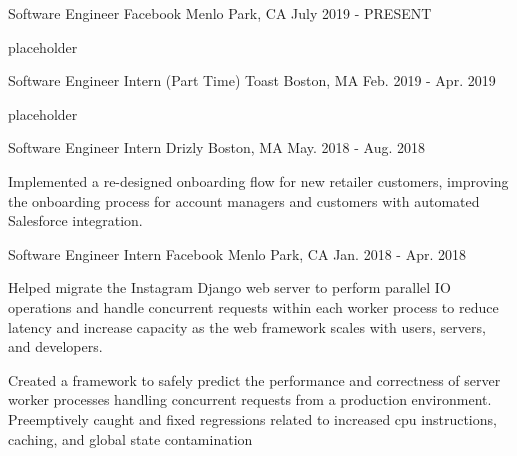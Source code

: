 
\begin{cventries}
  \cventry
    {Software Engineer} %
    {Facebook} %
    {Menlo Park, CA} %
    {July 2019 - PRESENT} %
    {
      \begin{cvitems} %
        \item {placeholder}
      \end{cvitems}
    }

  \cventry
    {Software Engineer Intern (Part Time)} %
    {Toast} %
    {Boston, MA} %
    {Feb. 2019 - Apr. 2019} %
    {
      \begin{cvitems} %
        \item {placeholder}
      \end{cvitems}
    }

  \cventry
    {Software Engineer Intern} %
    {Drizly} %
    {Boston, MA} %
    {May. 2018 - Aug. 2018} %
    {
      \begin{cvitems} %
        \item {Implemented a re-designed onboarding flow for new retailer customers, improving the onboarding process for account managers and customers with automated Salesforce integration.}
      \end{cvitems}
    }

  \cventry
    {Software Engineer Intern} %
    {Facebook} %
    {Menlo Park, CA} %
    {Jan. 2018 - Apr. 2018} %
    {
      \begin{cvitems} %
        \item {Helped migrate the Instagram Django web server to perform parallel IO operations and handle concurrent requests within each worker process to reduce latency and increase capacity as the web framework scales with users, servers, and developers.}
		\item {Created a framework to safely predict the performance and correctness of server worker processes handling concurrent requests from a production environment. Preemptively caught and fixed regressions related to increased cpu instructions, caching, and global state contamination}
      \end{cvitems}
    }


\end{cventries}
